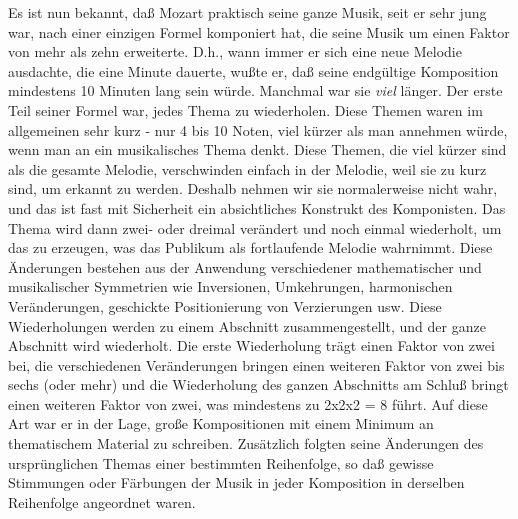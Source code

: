 Es ist nun bekannt, daß Mozart praktisch seine ganze Musik, seit er sehr jung war, nach einer einzigen Formel komponiert hat, die seine Musik um einen Faktor von mehr als zehn erweiterte.
D.h., wann immer er sich eine neue Melodie ausdachte, die eine Minute dauerte, wußte er, daß seine endgültige Komposition mindestens 10 Minuten lang sein würde.
Manchmal war sie \textit{viel} länger.
Der erste Teil seiner Formel war, jedes Thema zu wiederholen.
Diese Themen waren im allgemeinen sehr kurz - nur 4 bis 10 Noten, viel kürzer als man annehmen würde, wenn man an ein musikalisches Thema denkt.
Diese Themen, die viel kürzer sind als die gesamte Melodie, verschwinden einfach in der Melodie, weil sie zu kurz sind, um erkannt zu werden.
Deshalb nehmen wir sie normalerweise nicht wahr, und das ist fast mit Sicherheit ein absichtliches Konstrukt des Komponisten.
Das Thema wird dann zwei- oder dreimal verändert und noch einmal wiederholt, um das zu erzeugen, was das Publikum als fortlaufende Melodie wahrnimmt.
Diese Änderungen bestehen aus der Anwendung verschiedener mathematischer und musikalischer Symmetrien wie Inversionen, Umkehrungen, harmonischen Veränderungen, geschickte Positionierung von Verzierungen usw.
Diese Wiederholungen werden zu einem Abschnitt zusammengestellt, und der ganze Abschnitt wird wiederholt.
Die erste Wiederholung trägt einen Faktor von zwei bei, die verschiedenen Veränderungen bringen einen weiteren Faktor von zwei bis sechs (oder mehr) und die Wiederholung des ganzen Abschnitts am Schluß bringt einen weiteren Faktor von zwei, was mindestens zu 2x2x2 = 8 führt.
Auf diese Art war er in der Lage, große Kompositionen mit einem Minimum an thematischem Material zu schreiben.
Zusätzlich folgten seine Änderungen des ursprünglichen Themas einer bestimmten Reihenfolge, so daß gewisse Stimmungen oder Färbungen der Musik in jeder Komposition in derselben Reihenfolge angeordnet waren.

